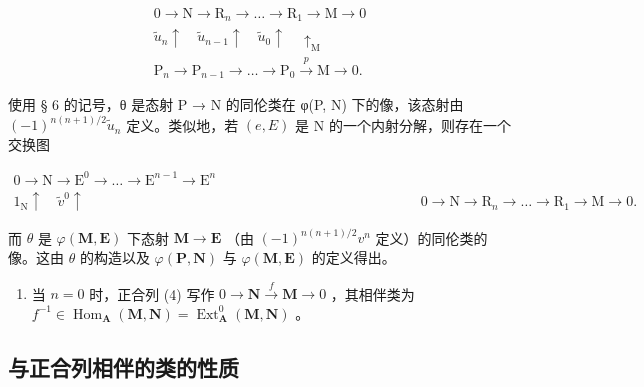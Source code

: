 \[
\begin{array}{c} 0 \longrightarrow \mathrm{N} \longrightarrow \mathrm{R} _ {n} \longrightarrow \dots \longrightarrow \mathrm{R} _ {1} \longrightarrow \mathrm{M} \longrightarrow 0 \\ \tilde {u} _ {n} \uparrow \quad \tilde {u} _ {n - 1} \uparrow \quad \tilde {u} _ {0} \uparrow \quad \uparrow_ {\mathrm{M}} \\ \mathrm{P} _ {n} \longrightarrow \mathrm{P} _ {n - 1} \longrightarrow \dots \longrightarrow \mathrm{P} _ {0} \xrightarrow {p} \mathrm{M} \longrightarrow 0. \end{array}
\]

使用 § 6 的记号，θ 是态射 P → N 的同伦类在 φ(P, N) 下的像，该态射由 \((-1)^{n(n+1)/2} \tilde{u}_{n}\) 定义。类似地，若 \((e, E)\) 是 N 的一个内射分解，则存在一个交换图

\[
\begin{array}{c} 0 \longrightarrow \mathrm{N} \longrightarrow \mathrm{E} ^ {0} \longrightarrow \dots \longrightarrow \mathrm{E} ^ {n - 1} \longrightarrow \mathrm{E} ^ {n} \\ 1 _ {\mathrm{N}} \uparrow \quad \tilde {v} ^ {0} \uparrow \quad \quad \quad \quad \quad \quad \quad \quad \quad \quad \quad \quad \quad \quad \quad \quad \quad \quad \quad \quad \quad \quad \quad \quad 0 \longrightarrow \mathrm{N} \longrightarrow \mathrm{R} _ {n} \longrightarrow \dots \longrightarrow \mathrm{R} _ {1} \longrightarrow \mathrm{M} \longrightarrow 0. \end{array}
\]

而 \(\theta\) 是 \(\varphi(\mathbf{M},\mathbf{E})\) 下态射 \(\mathbf{M}\to\mathbf{E}\) （由 \((-1)^{n(n+1)/2}v^{n}\) 定义）的同伦类的像。这由 \(\theta\) 的构造以及 \(\varphi(\mathbf{P},\mathbf{N})\) 与 \(\varphi(\mathbf{M},\mathbf{E})\) 的定义得出。

\begin{enumerate}
\def\labelenumi{\arabic{enumi})}
\setcounter{enumi}{1}
\tightlist
\item
  当 \(n = 0\) 时，正合列 (4) 写作 \(0 \to \mathbf{N} \xrightarrow{f} \mathbf{M} \to 0\) ，其相伴类为 \(f^{-1} \in \operatorname{Hom}_{\mathbf{A}}(\mathbf{M}, \mathbf{N}) = \operatorname{Ext}_{\mathbf{A}}^{0}(\mathbf{M}, \mathbf{N})\) 。
\end{enumerate}

\subsection{与正合列相伴的类的性质}

